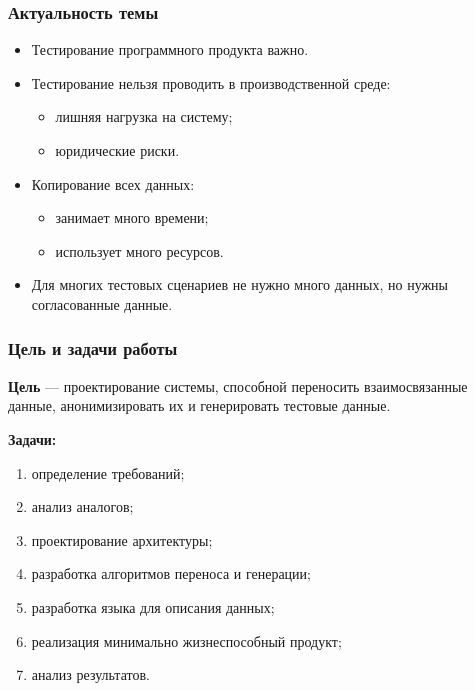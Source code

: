\documentclass[pdf, hyperref={unicode}, aspectratio=169]{beamer}
\begin{document}

{
	\frame{\titlepage}
}

\begin{frame}
	\frametitle{Актуальность темы}
	\begin{itemize}
		\item Тестирование программного продукта важно.

		\item Тестирование нельзя проводить в производственной среде:
		\begin{itemize}
			\item лишняя нагрузка на систему;
			\item юридические риски.
		\end{itemize}

		\item Копирование всех данных:
		\begin{itemize}
			\item занимает много времени;
			\item использует много ресурсов.
		\end{itemize}

		\item Для многих тестовых сценариев не нужно много данных, но нужны согласованные данные.
	\end{itemize}
\end{frame}


\begin{frame}
	\frametitle{Цель и задачи работы}
	
	\textbf{Цель} --- проектирование системы, способной переносить взаимосвязанные данные, анонимизировать их и генерировать тестовые данные.

	\textbf{Задачи:}
	\begin{enumerate}
		\item определение требований;
		\item анализ аналогов;
		\item проектирование архитектуры;
		\item разработка алгоритмов переноса и генерации;
		\item разработка языка для описания данных;
		\item реализация минимально жизнеспособный продукт;
		\item анализ результатов.
	\end{enumerate}
\end{frame}
\end{document}

